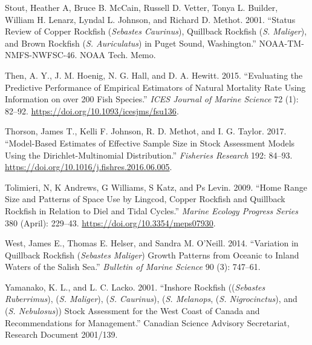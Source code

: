 \documentclass[11pt,
  english,
  a4paper,
]{article}
\begin{document}
\leavevmode\hypertarget{ref-Stoutetal_DPS_2001}{}%
Stout, Heather A, Bruce B. McCain, Russell D. Vetter, Tonya L. Builder, William H. Lenarz, Lyndal L. Johnson, and Richard D. Methot. 2001. ``Status Review of Copper Rockfish (\emph{Sebastes Caurinus}), Quillback Rockfish (\emph{S. Maliger}), and Brown Rockfish (\emph{S. Auriculatus}) in Puget Sound, Washington.'' NOAA-TM-NMFS-NWFSC-46. NOAA Tech. Memo.

\leavevmode\hypertarget{ref-then_evaluating_2015-1}{}%
Then, A. Y., J. M. Hoenig, N. G. Hall, and D. A. Hewitt. 2015. ``Evaluating the Predictive Performance of Empirical Estimators of Natural Mortality Rate Using Information on over 200 Fish Species.'' \emph{ICES Journal of Marine Science} 72 (1): 82--92. \url{https://doi.org/10.1093/icesjms/fsu136}.

\leavevmode\hypertarget{ref-thorson_model-based_2017}{}%
Thorson, James T., Kelli F. Johnson, R. D. Methot, and I. G. Taylor. 2017. ``Model-Based Estimates of Effective Sample Size in Stock Assessment Models Using the Dirichlet-Multinomial Distribution.'' \emph{Fisheries Research} 192: 84--93. \url{https://doi.org/10.1016/j.fishres.2016.06.005}.

\leavevmode\hypertarget{ref-tolimieri_home_2009}{}%
Tolimieri, N, K Andrews, G Williams, S Katz, and Ps Levin. 2009. ``Home Range Size and Patterns of Space Use by Lingcod, Copper Rockfish and Quillback Rockfish in Relation to Diel and Tidal Cycles.'' \emph{Marine Ecology Progress Series} 380 (April): 229--43. \url{https://doi.org/10.3354/meps07930}.

\leavevmode\hypertarget{ref-Westetal_2014}{}%
West, James E., Thomas E. Helser, and Sandra M. O'Neill. 2014. ``Variation in Quillback Rockfish (\emph{Sebastes Maliger}) Growth Patterns from Oceanic to Inland Waters of the Salish Sea.'' \emph{Bulletin of Marine Science} 90 (3): 747--61.

\leavevmode\hypertarget{ref-YamanakaandLacko_rockfish_2001}{}%
Yamanako, K. L., and L. C. Lacko. 2001. ``Inshore Rockfish ((\emph{Sebastes Ruberrimus}), (\emph{S. Maliger}), (\emph{S. Caurinus}), (\emph{S. Melanops}, (\emph{S. Nigrocinctus}), and (\emph{S. Nebulosus})) Stock Assessment for the West Coast of Canada and Recommendations for Management.'' Canadian Science Advisory Secretariat, Research Document 2001/139.

\leavevmode\tagmcend\tagstructend

\clearpage

\end{document}
